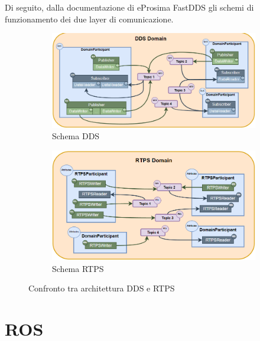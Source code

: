 Di seguito, dalla documentazione di eProsima FastDDS\cite{FastDDS} gli schemi di funzionamento dei due layer di comunicazione.
\begin{figure}[H]
    \centering
    \begin{subfigure}{0.45\linewidth}
      \centering
      \includegraphics[width=\linewidth]{./img/dds_architecture.png}
      \caption{Schema DDS}\label{fig:dds}
    \end{subfigure}
    \begin{subfigure}{0.45\linewidth}
      \centering
      \includegraphics[width=\linewidth]{./img/rtps_architecture.png}
      \caption{Schema RTPS}\label{fig:rtps}
    \end{subfigure}
    \caption{Confronto tra architettura DDS e RTPS}\label{fig:confrontodds_rtps}
  \end{figure}

\section{ROS}\label{SSEC:rosiface}


